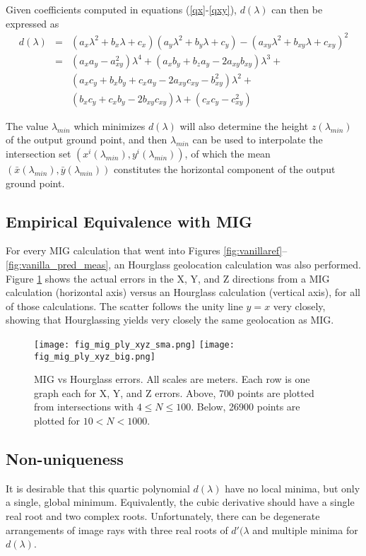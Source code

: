 \documentclass[10pt]{amsart}
\begin{document}
Given coefficients computed in equations (\ref{qx}-\ref{qxy}),
$d(\lambda)$ can then be expressed as
\begin{eqnarray}\label{d}
d(\lambda) &=& (a_x\lambda^2 + b_x\lambda + c_x)(a_y\lambda^2 + b_y\lambda + c_y) - 
(a_{xy}\lambda^2 + b_{xy}\lambda + c_{xy})^2 \nonumber \\
&=& (a_xa_y-a_{xy}^2)\lambda^4 + (a_xb_y+b_za_y-2a_{xy}b_{xy})\lambda^3 + \nonumber \\
&& (a_xc_y+b_xb_y+c_xa_y-2a_{xy}c_{xy}-b^2_{xy})\lambda^2 +\\
&& (b_xc_y+c_xb_y-2b_{xy}c_{xy})\lambda + (c_xc_y-c^2_{xy}) \nonumber
\end{eqnarray}

The value $\lambda_{min}$ which minimizes $d(\lambda)$ will also determine the
height $z(\lambda_{min})$ of the output ground point, and then $\lambda_{min}$
can be used to interpolate the intersection set
$(x^i(\lambda_{min}), y^i(\lambda_{min}))$, of which the mean
$(\bar{x}(\lambda_{min}), \bar{y}(\lambda_{min}))$ constitutes the horizontal
component of the output ground point.

\subsection{Empirical Equivalence with MIG}
For every MIG calculation that went into Figures
\ref{fig:vanillaref}--\ref{fig:vanilla_pred_meas}, an Hourglass geolocation
calculation was also performed. Figure \ref{fig:mig_vs_hourglass} shows the
actual errors in the X, Y, and Z directions from a MIG calculation (horizontal
axis) versus an Hourglass calculation (vertical axis), for all of those
calculations. The scatter follows the unity line $y=x$ very closely, showing
that Hourglassing yields very closely the same geolocation as MIG.

\begin{figure}
\texttt{[image: fig\_mig\_ply\_xyz\_sma.png]}
\texttt{[image: fig\_mig\_ply\_xyz\_big.png]}
\caption{\label{fig:mig_vs_hourglass}MIG vs Hourglass errors. All scales are
  meters. Each row is one graph each for X, Y, and Z errors. Above, 700 points
  are plotted from intersections with $4\le N\le 100$. Below, 26900 points are
  plotted for $10<N<1000$.}
\end{figure}


\subsection{Non-uniqueness}
It is desirable that this quartic polynomial $d(\lambda)$ have no
local minima, but only a single, global minimum. Equivalently, the
cubic derivative should have a single real root and two complex
roots. Unfortunately, there can be degenerate arrangements of image
rays with three real roots of $d'(\lambda$ and multiple minima for
$d(\lambda)$.
\end{document}
